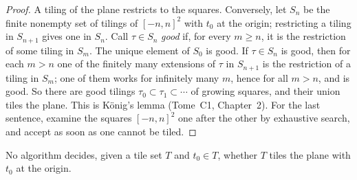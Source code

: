 \begin{proof}
A tiling of the plane restricts to the squares. Conversely, let $S_n$ be the finite nonempty set of tilings of $[-n,n]^2$ with $t_0$ at the origin; restricting a tiling in $S_{n+1}$ gives one in $S_n$. Call $\tau\in S_n$ \emph{good} if, for every $m\ge n$, it is the restriction of some tiling in $S_m$. The unique element of $S_0$ is good. If $\tau\in S_n$ is good, then for each $m>n$ one of the finitely many extensions of $\tau$ in $S_{n+1}$ is the restriction of a tiling in $S_m$; one of them works for infinitely many $m$, hence for all $m>n$, and is good. So there are good tilings $\tau_0\subset\tau_1\subset\cdots$ of growing squares, and their union tiles the plane. This is König's lemma (Tome~C1, Chapter~2). For the last sentence, examine the squares $[-n,n]^2$ one after the other by exhaustive search, and accept as soon as one cannot be tiled.
\end{proof}

\begin{theorem}\label{thm:wang}
No algorithm decides, given a tile set $T$ and $t_0\in T$, whether $T$ tiles the plane with $t_0$ at the origin.
\end{theorem}

